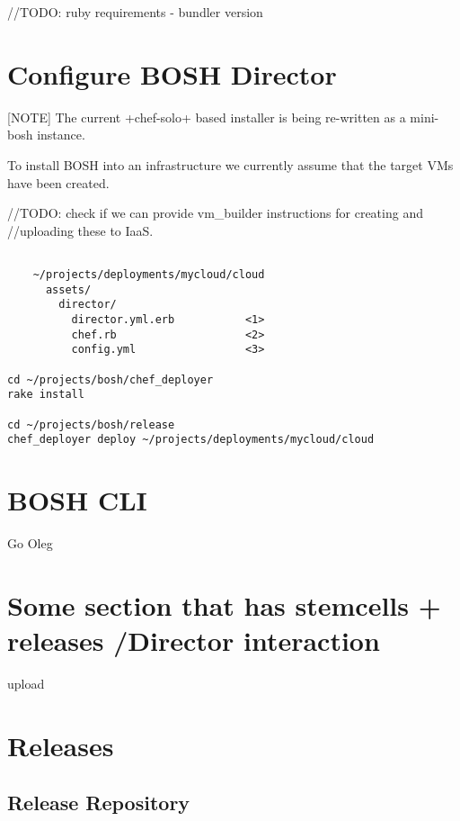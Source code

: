 /\slash TODO: ruby requirements - bundler version

\chapter{Configure BOSH Director}
\label{configureboshdirector}

[NOTE]
The current +chef-solo+ based installer is being re-written as a
mini-bosh instance.

To install BOSH into an infrastructure we currently assume that the
target VMs have been created.

/\slash TODO: check if we can provide vm\_builder instructions for creating and
/\slash uploading these to IaaS.

\begin{adjustwidth}{2.5em}{2.5em}
\begin{verbatim}

    ~/projects/deployments/mycloud/cloud
      assets/
        director/
          director.yml.erb           <1>
          chef.rb                    <2>
          config.yml                 <3>

cd ~/projects/bosh/chef_deployer
rake install

cd ~/projects/bosh/release
chef_deployer deploy ~/projects/deployments/mycloud/cloud

\end{verbatim}
\end{adjustwidth}

\chapter{BOSH CLI}
\label{boshcli}

Go Oleg

\chapter{Some section that has stemcells + releases \slash  Director interaction}
\label{somesectionthathasstemcellsreleasesdirectorinteraction}

upload

\chapter{Releases}
\label{releases}

\section{Release Repository}
\label{releaserepository}


